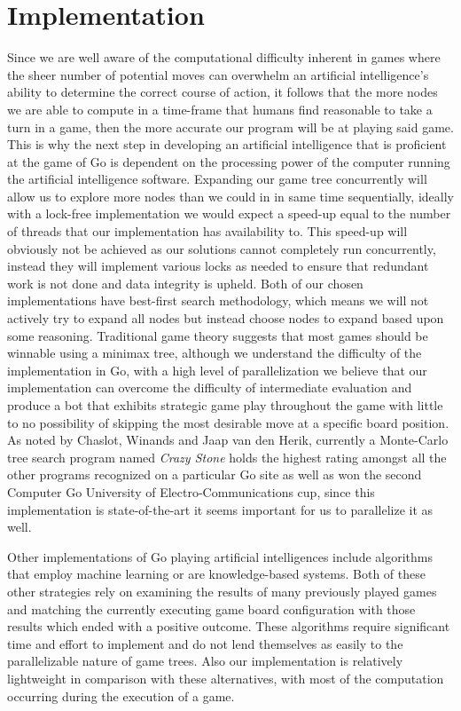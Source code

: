 \documentclass[conference]{IEEEtran}
\begin{document}
\section{Implementation}
Since we are well aware of the computational difficulty inherent in games where the sheer number of potential moves can overwhelm an artificial intelligence's ability to determine the correct course of action, it follows that the more nodes we are able to compute in a time-frame that humans find reasonable to take a turn in a game, then the more accurate our program will be at playing said game. This is why the next step in developing an artificial intelligence that is proficient at the game of Go is dependent on the processing power of the computer running the artificial intelligence software. Expanding our game tree concurrently will allow us to explore more nodes than we could in in same time sequentially, ideally with a lock-free implementation we would expect a speed-up equal to the number of threads that our implementation has availability to. This speed-up will obviously not be achieved as our solutions cannot completely run concurrently, instead they will implement various locks as needed to ensure that redundant work is not done and data integrity is upheld. Both of our chosen implementations have best-first search methodology, which means we will not actively try to expand all nodes but instead choose nodes to expand based upon some reasoning. Traditional game theory suggests that most games should be winnable using a minimax tree, although we understand the difficulty of the implementation in Go, with a high level of parallelization we believe that our implementation can overcome the difficulty of intermediate evaluation and produce a bot that exhibits strategic game play throughout the game with little to no possibility of skipping the most desirable move at a specific board position. As noted by Chaslot, Winands and Jaap van den Herik, currently a Monte-Carlo tree search program named \textit{Crazy Stone} holds the highest rating amongst all the other programs recognized on a particular Go site as well as won the second Computer Go University of Electro-Communications cup, since this implementation is state-of-the-art it seems important for us to parallelize it as well.\par
Other implementations of Go playing artificial intelligences include algorithms that employ machine learning or are knowledge-based systems. Both of these other strategies rely on examining the results of many previously played games and matching the currently executing game board configuration with those results which ended with a positive outcome. These algorithms require significant time and effort to implement and do not lend themselves as easily to the parallelizable nature of game trees. Also our implementation is relatively lightweight in comparison with these alternatives, with most of the computation occurring during the execution of a game.
\end{document}
